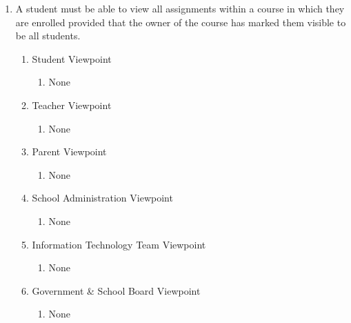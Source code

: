 \documentclass[]{article}
\begin{document}
\begin{enumerate}[{BE}1.]
	\item A student must be able to view all assignments within a course in which 
they are enrolled provided that the owner of the course has marked them visible 
to be all students.
	\begin{enumerate}[{VP2}.1]
		\item Student Viewpoint
			\begin{enumerate}
				\item None
			\end{enumerate}
		\item Teacher Viewpoint
			\begin{enumerate}
				\item None
			\end{enumerate}
		\item Parent Viewpoint
			\begin{enumerate}
				\item None
			\end{enumerate}
		\item School Administration Viewpoint
			\begin{enumerate}
				\item None
			\end{enumerate}
		\item Information Technology Team Viewpoint
			\begin{enumerate}
				\item None
			\end{enumerate}
		\item Government \& School Board Viewpoint
			\begin{enumerate}
				\item None
			\end{enumerate}
	\end{enumerate}


\end{enumerate}
\end{document}
